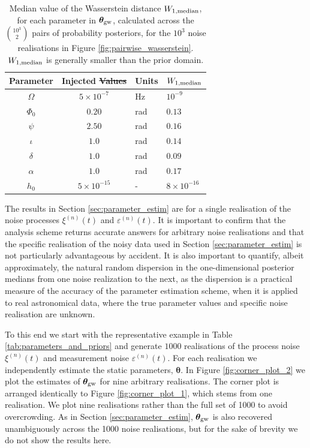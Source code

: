 \documentclass[fleqn,usenatbib,useAMS]{mnras}
\providecommand{\DIFadd}[1]{{\protect\color{blue}\uwave{#1}}} %
\providecommand{\DIFdel}[1]{{\protect\color{red}\sout{#1}}}                      %
\providecommand{\DIFaddbegin}{} %
\providecommand{\DIFaddend}{} %
\providecommand{\DIFdelbegin}{} %
\providecommand{\DIFdelend}{} %
\providecommand{\DIFaddFL}[1]{\DIFadd{#1}} %
\providecommand{\DIFdelFL}[1]{\DIFdel{#1}} %
\providecommand{\DIFaddbeginFL}{} %
\providecommand{\DIFaddendFL}{} %
\providecommand{\DIFdelbeginFL}{} %
\providecommand{\DIFdelendFL}{} %
\newcommand{\DIFscaledelfig}{0.5}
\newlength{\DIFdelgraphicswidth} %
\newlength{\DIFdelgraphicsheight} %
\newcommand{\DIFaddincludegraphics}[2][]{{\color{blue}\fbox{\DIFOincludegraphics[#1]{#2}}}} %
\newcommand{\DIFdelincludegraphics}[2][]{%
\sbox{\DIFdelgraphicsbox}{\DIFOincludegraphics[#1]{#2}}%
\settoboxwidth{\DIFdelgraphicswidth}{\DIFdelgraphicsbox} %
\settoboxtotalheight{\DIFdelgraphicsheight}{\DIFdelgraphicsbox} %
\scalebox{\DIFscaledelfig}{%
\parbox[b]{\DIFdelgraphicswidth}{\usebox{\DIFdelgraphicsbox}\\[-\baselineskip] \rule{\DIFdelgraphicswidth}{0em}}\llap{\resizebox{\DIFdelgraphicswidth}{\DIFdelgraphicsheight}{%
\setlength{\unitlength}{\DIFdelgraphicswidth}%
\begin{picture}(1,1)%
\thicklines\linethickness{2pt} %
{\color[rgb]{1,0,0}\put(0,0){\framebox(1,1){}}}%
{\color[rgb]{1,0,0}\put(0,0){\line( 1,1){1}}}%
{\color[rgb]{1,0,0}\put(0,1){\line(1,-1){1}}}%
\end{picture}%
}\hspace*{3pt}}} %
} %
\DeclareRobustCommand{\DIFaddbegin}{\DIFOaddbegin \let\includegraphics\DIFaddincludegraphics} %
\DeclareRobustCommand{\DIFaddend}{\DIFOaddend \let\includegraphics\DIFOincludegraphics} %
\DeclareRobustCommand{\DIFdelbegin}{\DIFOdelbegin \let\includegraphics\DIFdelincludegraphics} %
\DeclareRobustCommand{\DIFdelend}{\DIFOaddend \let\includegraphics\DIFOincludegraphics} %
\DeclareRobustCommand{\DIFaddbeginFL}{\DIFOaddbeginFL \let\includegraphics\DIFaddincludegraphics} %
\DeclareRobustCommand{\DIFaddendFL}{\DIFOaddendFL \let\includegraphics\DIFOincludegraphics} %
\DeclareRobustCommand{\DIFdelbeginFL}{\DIFOdelbeginFL \let\includegraphics\DIFdelincludegraphics} %
\DeclareRobustCommand{\DIFdelendFL}{\DIFOaddendFL \let\includegraphics\DIFOincludegraphics} %
\begin{document}
\begin{table}
	\centering
	\begin{tabular}{ccll}
		\toprule
		Parameter & Injected \DIFdelbeginFL \DIFdelFL{Values }\DIFdelendFL \DIFaddbeginFL \DIFaddFL{value }\DIFaddendFL & Units & $W_{1, \rm median}$  \\
		\hline
		$\Omega$     &   $5 \times 10^{-7}$ & Hz & $10^{-9}$ \\
		$\Phi_0$          & $0.20$ & rad & $0.13$ \\
		$\psi$              & $2.50$ & rad & $0.16$ \\
		$\iota$             & $1.0$ & rad & $0.14$ \\ 
		$\delta$              & $1.0$  & rad & $0.09$ \\
		$\alpha$          & $1.0$  & rad & $0.17$\\
		$h_0$            & $5 \times 10^{-15}$ & - & $8 \times 10^{-16}$ \\
		\bottomrule
	\end{tabular}
	\caption{Median value of the Wasserstein distance $W_{1, \rm median}$, for each parameter in $\boldsymbol{\theta}_{\rm gw}$, calculated across the $10^3 \choose 2$ pairs of probability posteriors, for the $10^3$ noise realisations in Figure \ref{fig:pairwise_wasserstein}. $W_{1, \rm median}$ is generally smaller than the prior domain.}
	\label{tab:Wasserstein}
\end{table}

The results in Section \ref{sec:parameter_estim} are for a single realisation of the noise processes $\xi^{(n)}(t)$ and $\varepsilon^{(n)}(t)$. It is important to confirm that the analysis scheme returns accurate answers for arbitrary noise realisations and that the specific realisation of the noisy data used in Section \ref{sec:parameter_estim} is not particularly advantageous by accident. It is also important to quantify, albeit approximately, the natural random dispersion in the one-dimensional posterior medians from one noise realization to the next, as the dispersion is a practical measure of the accuracy of the parameter estimation scheme, when it is applied to real astronomical data, where the true parameter values and specific noise realisation are unknown. \newline 

To this end we start with the representative example in Table \ref{tab:parameters_and_priors} and generate $1000$ realisations of the process noise $\xi^{(n)}(t)$ and measurement noise $\varepsilon^{(n)}(t)$. For each realisation we independently estimate the static parameters, $\boldsymbol{\theta}$. In Figure \ref{fig:corner_plot_2} we plot the estimates of $\boldsymbol{\theta}_{\rm gw}$ for nine arbitrary realisations. The corner plot is arranged identically to Figure \ref{fig:corner_plot_1}, which stems from one realisation. We plot nine realisations rather than the full set of 1000 to avoid overcrowding. As in Section \ref{sec:parameter_estim}, \DIFdelbegin \DIFdel{$\boldsymbol{\theta}_{\rm gw}$ }\DIFdelend \DIFaddbegin \DIFadd{$\boldsymbol{\theta}_{\rm psr}$ }\DIFaddend is also recovered unambiguously across the 1000 noise realisations, but for the sake of brevity we do not show the results here. \newline 
\end{document}
